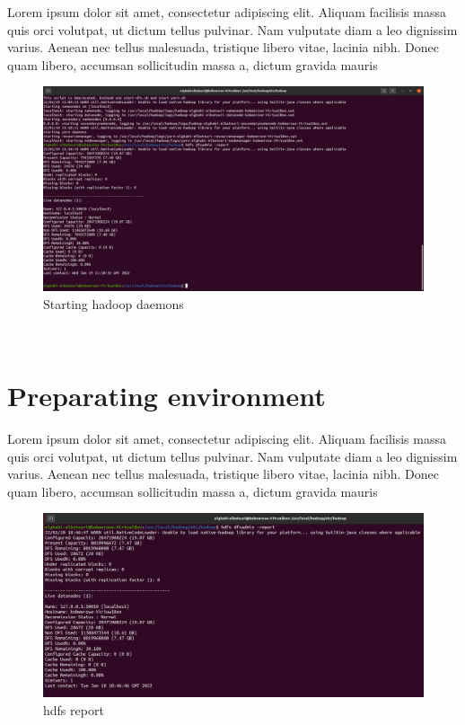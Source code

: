 \begin{spacing}{1.2}
\par Lorem ipsum dolor sit amet, consectetur adipiscing elit. Aliquam facilisis massa quis orci volutpat, ut dictum tellus pulvinar. Nam vulputate diam a leo dignissim varius. Aenean nec tellus malesuada, tristique libero vitae, lacinia nibh. Donec quam libero, accumsan sollicitudin massa a, dictum gravida mauris
\\
\begin{figure}[!htb] 
\begin{center} 
\includegraphics[width=1\linewidth]{Pictures/HBase/Configuring Hbase in Standalone & Pseudo-distributed mode/Installing and Configuring Apache Hbase/Starting hadoop daemons} 
\end{center} 
\caption{Starting hadoop daemons} 
\end{figure}  \FloatBarrier
\\
\section{Preparating environment }
\par Lorem ipsum dolor sit amet, consectetur adipiscing elit. Aliquam facilisis massa quis orci volutpat, ut dictum tellus pulvinar. Nam vulputate diam a leo dignissim varius. Aenean nec tellus malesuada, tristique libero vitae, lacinia nibh. Donec quam libero, accumsan sollicitudin massa a, dictum gravida mauris
\\
\begin{figure}[!htb] 
\begin{center} 
\includegraphics[width=1\linewidth]{Pictures/HBase/Configuring Hbase in Standalone & Pseudo-distributed mode/Preparating environment/hdfs report} 
\end{center} 
\caption{hdfs report} 
\end{figure}  \FloatBarrier
\\

\end{spacing}
